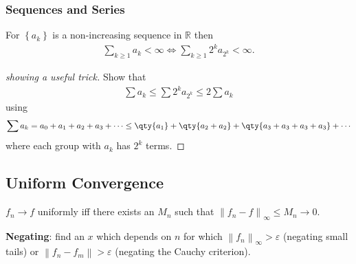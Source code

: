 \hypertarget{sequences-and-series}{%
\subsubsection{Sequences and Series}\label{sequences-and-series}}

\begin{proposition}

For \(\left\{{a_k}\right\}\) is a non-increasing sequence in
\({\mathbb{R}}\) then
\begin{align*}
\sum_{k\geq 1} a_k < \infty \iff \sum_{k\geq 1} 2^k a_{2^k}<\infty
.\end{align*}

\end{proposition}

\begin{proof}[showing a useful trick]

Show that
\begin{align*}
\sum a_k \leq \sum 2^k a_{2^k} \leq 2 \sum a_k
\end{align*}
using
\begin{align*}
\sum a_k = a_0 + a_1 + a_2 + a_3 + \cdots
\leq \qty{a_1} + \qty{a_2 + a_2} + \qty {a_3 + a_3 + a_3 + a_3} + \cdots \\
\end{align*}
where each group with \(a_k\) has \(2^k\) terms.

\end{proof}

\hypertarget{uniform-convergence}{%
\subsection{Uniform Convergence}\label{uniform-convergence}}

\begin{proposition}

\(f_n \to f\) uniformly iff there exists an \(M_n\) such that
\({\left\lVert {f_n - f} \right\rVert}_\infty \leq M_n \to 0\).

\end{proposition}

\begin{remark}

\textbf{Negating}: find an \(x\) which depends on \(n\) for which
\({\left\lVert {f_n} \right\rVert}_\infty > {\varepsilon}\) (negating
small tails) or
\({\left\lVert {f_n - f_m} \right\rVert} > {\varepsilon}\) (negating the
Cauchy criterion).

\end{remark}

